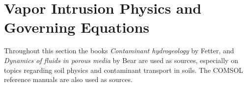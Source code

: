 \section{Vapor Intrusion Physics and Governing Equations}

Throughout this section the books \textit{Contaminant hydrogeology}\cite{fetter_contaminant_1993} by Fetter, and \textit{Dynamics of fluids in porous media}\cite{bear_dynamics_1972} by Bear are used as sources, especially on topics regarding soil physics and contaminant transport in soils.
The COMSOL reference manuals\cite{comsol_comsol_nodate,comsol_subsurface_nodate} are also used as sources.
